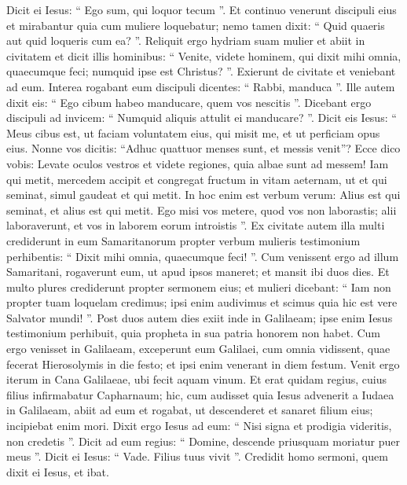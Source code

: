 \begin{biblechapter}
\begin{biblechapter}
\begin{biblechapter}
\begin{biblechapter}
\verse Dicit ei Iesus: “ Ego sum, qui loquor tecum ”.
 \verse Et continuo venerunt discipuli eius et mirabantur quia cum muliere loquebatur; nemo tamen dixit: “ Quid quaeris aut quid loqueris cum ea? ”. 
\verse Reliquit ergo hydriam suam mulier et abiit in civitatem et dicit illis hominibus: 
\verse “ Venite, videte hominem, qui dixit mihi omnia, quaecumque feci; numquid ipse est Christus? ”. 
\verse Exierunt de civitate et veniebant ad eum.
 \verse Interea rogabant eum discipuli dicentes: “ Rabbi, manduca ”. 
\verse Ille autem dixit eis: “ Ego cibum habeo manducare, quem vos nescitis ”. 
\verse Dicebant ergo discipuli ad invicem: “ Numquid aliquis attulit ei manducare? ”. 
 \verse Dicit eis Iesus: “ Meus cibus est, ut faciam voluntatem eius, qui misit me, et ut perficiam opus eius. 
\verse Nonne vos dicitis: “Adhuc quattuor menses sunt, et messis venit”? Ecce dico vobis: Levate oculos vestros et videte regiones, quia albae sunt ad messem! Iam 
\verse qui metit, mercedem accipit et congregat fructum in vitam aeternam, ut et qui seminat, simul gaudeat et qui metit. 
\verse In hoc enim est verbum verum: Alius est qui seminat, et alius est qui metit. 
\verse Ego misi vos metere, quod vos non laborastis; alii laboraverunt, et vos in laborem eorum introistis ”.
 \verse Ex civitate autem illa multi crediderunt in eum Samaritanorum propter verbum mulieris testimonium perhibentis: “ Dixit mihi omnia, quaecumque feci! ”. 
\verse Cum venissent ergo ad illum Samaritani, rogaverunt eum, ut apud ipsos maneret; et mansit ibi duos dies. 
\verse Et multo plures crediderunt propter sermonem eius; 
\verse et mulieri dicebant: “ Iam non propter tuam loquelam credimus; ipsi enim audivimus et scimus quia hic est vere Salvator mundi! ”.
 \verse Post duos autem dies exiit inde in Galilaeam; 
\verse ipse enim Iesus testimonium perhibuit, quia propheta in sua patria honorem non habet. 
\verse Cum ergo venisset in Galilaeam, exceperunt eum Galilaei, cum omnia vidissent, quae fecerat Hierosolymis in die festo; et ipsi enim venerant in diem festum.
 \verse Venit ergo iterum in Cana Galilaeae, ubi fecit aquam vinum. Et erat quidam regius, cuius filius infirmabatur Capharnaum; 
\verse hic, cum audisset quia Iesus advenerit a Iudaea in Galilaeam, abiit ad eum et rogabat, ut descenderet et sanaret filium eius; incipiebat enim mori. 
\verse Dixit ergo Iesus ad eum: “ Nisi signa et prodigia videritis, non credetis ”. 
\verse Dicit ad eum regius: “ Domine, descende priusquam moriatur puer meus ”. 
\verse Dicit ei Iesus: “ Vade. Filius tuus vivit ”. Credidit homo sermoni, quem dixit ei Iesus, et ibat. 

\end{biblechapter}
\end{biblechapter}
\end{biblechapter}
\end{biblechapter}
